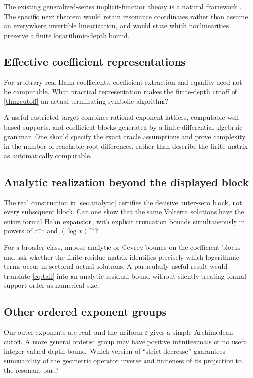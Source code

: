 \documentclass[11pt,a4paper]{article}
\numberwithin{equation}{section}
\theoremstyle{definition}
\theoremstyle{remark}
\newcommand{\eps}{\varepsilon}
\begin{document}
The existing generalized-series implicit-function theory is a natural framework \cite{vdh2001}. The specific next theorem would retain resonance coordinates rather than assume an everywhere invertible linearization, and would state which nonlinearities preserve a finite logarithmic-depth bound.

\subsection{Effective coefficient representations}
For arbitrary real Hahn coefficients, coefficient extraction and equality need not be computable. What practical representation makes the finite-depth cutoff of \cref{thm:cutoff} an actual terminating symbolic algorithm?

A useful restricted target combines rational exponent lattices, computable well-based supports, and coefficient blocks generated by a finite differential-algebraic grammar. One should specify the exact oracle assumptions and prove complexity in the number of reachable root differences, rather than describe the finite matrix as automatically computable.

\subsection{Analytic realization beyond the displayed block}
The real construction in \cref{sec:analytic} certifies the decisive outer-zero block, not every subsequent block. Can one show that the same Volterra solutions have the entire formal Hahn expansion, with explicit truncation bounds simultaneously in powers of $x^{-1}$ and $(\log x)^{-1}$?

For a broader class, impose analytic or Gevrey bounds on the coefficient blocks and ask whether the finite residue matrix identifies precisely which logarithmic terms occur in sectorial actual solutions. A particularly useful result would translate \eqref{eq:tail} into an analytic residual bound without silently treating formal support order as numerical size.

\subsection{Other ordered exponent groups}
Our outer exponents are real, and the uniform $\eps$ gives a simple Archimedean cutoff. A more general ordered group may have positive infinitesimals or no useful integer-valued depth bound. Which version of ``strict decrease'' guarantees summability of the geometric operator inverse and finiteness of its projection to the resonant part?
\end{document}
